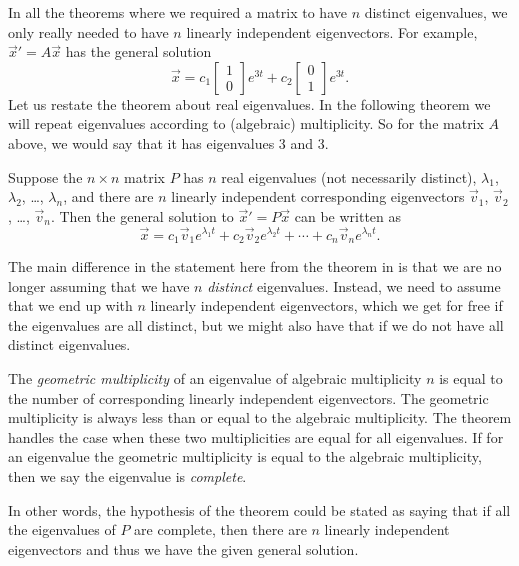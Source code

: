 In all the
theorems where we required a matrix to have $n$ distinct eigenvalues, we only
really needed to have $n$ linearly independent eigenvectors.  For example,
${\vec{x}}' = A\vec{x}$ has the general solution
\begin{equation*}
\vec{x} = 
c_1 \begin{bmatrix} 1 \\ 0 \end{bmatrix} e^{3t}
+ c_2 \begin{bmatrix} 0 \\ 1 \end{bmatrix} e^{3t} .
\end{equation*}
Let us restate the theorem about real eigenvalues.  In the following theorem
we will repeat eigenvalues according to (algebraic) multiplicity.  So
for the matrix $A$ above, we would say that it has eigenvalues 3 and 3.

\begin{theorem1}{}
Suppose the $n \times n$ matrix $P$ 
has $n$ real eigenvalues (not necessarily distinct), $\lambda_1$,
$\lambda_2$, \ldots, $\lambda_n$,
and there are $n$ linearly independent corresponding eigenvectors
$\vec{v}_1$, $\vec{v}_2$, \ldots, $\vec{v}_n$.  Then the general solution to 
${\vec{x}}' = P\vec{x}$
can be written as
\begin{equation*}
\vec{x} = c_1 \vec{v}_1 e^{\lambda_1 t} +
c_2 \vec{v}_2 e^{\lambda_2 t} + \cdots +
c_n \vec{v}_n e^{\lambda_n t} .
\end{equation*}
\end{theorem1}
The main difference in the statement here from the theorem in  is that we are no longer assuming that we have $n$ \emph{distinct} eigenvalues. Instead, we need to assume that we end up with $n$ linearly independent eigenvectors, which we get for free if the eigenvalues are all distinct, but we might also have that if we do not have all distinct eigenvalues.

The \emph{geometric multiplicity} of an eigenvalue of algebraic multiplicity $n$
is equal to the number of corresponding linearly independent eigenvectors.
The geometric multiplicity is always less than or
equal to the algebraic multiplicity.  The theorem handles the case
when these two multiplicities are equal for all eigenvalues.
If for an eigenvalue the geometric multiplicity is equal
to the algebraic multiplicity, then we say the eigenvalue is
\emph{complete}.

In other words, 
the hypothesis of the theorem could be stated as saying that if all
the eigenvalues of $P$ are complete, then there are $n$ linearly independent
eigenvectors and thus we have the given general solution.


